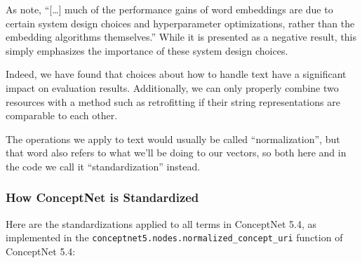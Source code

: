 \documentclass[letterpaper]{article}
\begin{document}
As  note,
``[\ldots] much of the performance gains of word embeddings are due to certain
system design choices and hyperparameter optimizations, rather than the
embedding algorithms themselves.'' While it is presented as a negative result,
this simply emphasizes the importance of these system design choices.

Indeed, we have found that choices about how to handle text have a significant
impact on evaluation results. Additionally, we can only properly combine two
resources with a method such as retrofitting if their string representations
are comparable to each other.

The operations we apply to text would usually be called ``normalization'',
but that word also refers to what we'll be doing to our vectors, so both
here and in the code we call it ``standardization'' instead.

\subsubsection{How ConceptNet is Standardized}

Here are the standardizations applied to all terms in ConceptNet 5.4, as
implemented in the {\tt conceptnet5.nodes.normalized\_concept\_uri} function
of ConceptNet 5.4:
\end{document}
